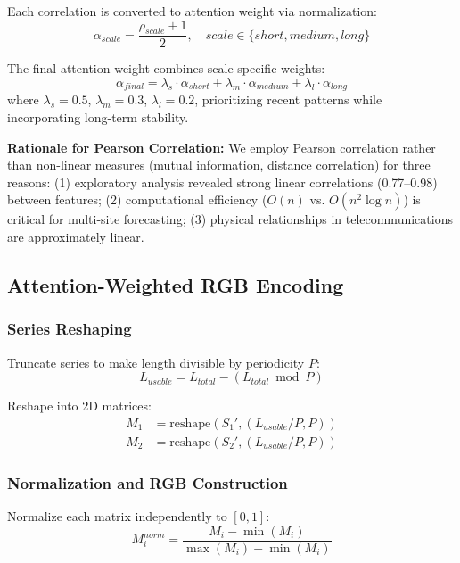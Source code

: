 \documentclass[preprint,12pt,authoryear]{elsarticle}
\begin{document}
Each correlation is converted to attention weight via normalization:
\begin{equation}
    \alpha_{scale} = \frac{\rho_{scale} + 1}{2}, \quad scale \in \{short, medium, long\}
\end{equation}

The final attention weight combines scale-specific weights:
\begin{equation}
    \alpha_{final} = \lambda_s \cdot \alpha_{short} + \lambda_m \cdot \alpha_{medium} + \lambda_l \cdot \alpha_{long}
\end{equation}
where $\lambda_s = 0.5$, $\lambda_m = 0.3$, $\lambda_l = 0.2$, prioritizing recent patterns while incorporating long-term stability.

\textbf{Rationale for Pearson Correlation:} We employ Pearson correlation rather than non-linear measures (mutual information, distance correlation) for three reasons: (1) exploratory analysis revealed strong linear correlations (0.77--0.98) between features; (2) computational efficiency ($O(n)$ vs. $O(n^2 \log n)$) is critical for multi-site forecasting; (3) physical relationships in telecommunications are approximately linear.

\subsection{Attention-Weighted RGB Encoding}

\subsubsection{Series Reshaping}

Truncate series to make length divisible by periodicity $P$:
\begin{equation}
    L_{usable} = L_{total} - (L_{total} \bmod P)
\end{equation}

Reshape into 2D matrices:
\begin{align}
    M_1 &= \text{reshape}(S_1', (L_{usable}/P, P)) \\
    M_2 &= \text{reshape}(S_2', (L_{usable}/P, P))
\end{align}

\subsubsection{Normalization and RGB Construction}

Normalize each matrix independently to $[0, 1]$:
\begin{equation}
    M_i^{norm} = \frac{M_i - \min(M_i)}{\max(M_i) - \min(M_i)}
\end{equation}
\end{document}

